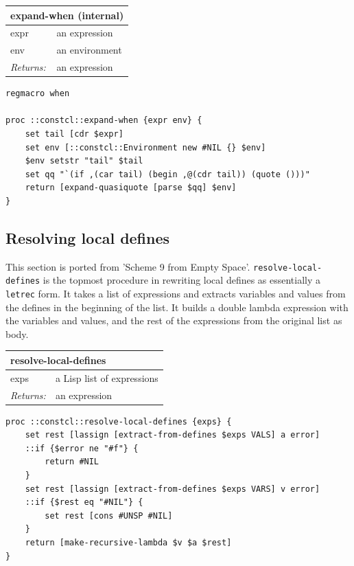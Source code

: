 \documentclass[twoside,9pt]{report}
\begin{document}
\begin{tabular}{ |l l| }
\hline
\multicolumn{2}{|l|}{expand-when (internal)} \\
\hline
expr & an expression \\
env & an environment \\
\textit{Returns:} & an expression \\
\hline
\end{tabular}

\noindent\makebox[\linewidth]{\rule{\linewidth}{0.4pt}}
\begin{lstlisting}
regmacro when
 
proc ::constcl::expand-when {expr env} {
    set tail [cdr $expr]
    set env [::constcl::Environment new #NIL {} $env]
    $env setstr "tail" $tail
    set qq "`(if ,(car tail) (begin ,@(cdr tail)) (quote ()))"
    return [expand-quasiquote [parse $qq] $env]
}
\end{lstlisting}
\noindent\makebox[\linewidth]{\rule{\linewidth}{0.4pt}}
\subsection{Resolving local defines}
\label{resolving-local-defines}

This section is ported from 'Scheme 9 from Empty Space'. \texttt{resolve-local-defines} is the topmost procedure in rewriting local defines as essentially a \texttt{letrec} form. It takes a list of expressions and extracts variables and values from the defines in the beginning of the list. It builds a double lambda expression with the variables and values, and the rest of the expressions from the original list as body.

\begin{tabular}{ |l l| }
\hline
\multicolumn{2}{|l|}{resolve-local-defines} \\
\hline
exps & a Lisp list of expressions \\
\textit{Returns:} & an expression \\
\hline
\end{tabular}

\noindent\makebox[\linewidth]{\rule{\linewidth}{0.4pt}}
\begin{lstlisting}
proc ::constcl::resolve-local-defines {exps} {
    set rest [lassign [extract-from-defines $exps VALS] a error]
    ::if {$error ne "#f"} {
        return #NIL
    }
    set rest [lassign [extract-from-defines $exps VARS] v error]
    ::if {$rest eq "#NIL"} {
        set rest [cons #UNSP #NIL]
    }
    return [make-recursive-lambda $v $a $rest]
}
\end{lstlisting}
\noindent\makebox[\linewidth]{\rule{\linewidth}{0.4pt}}
\end{document}
